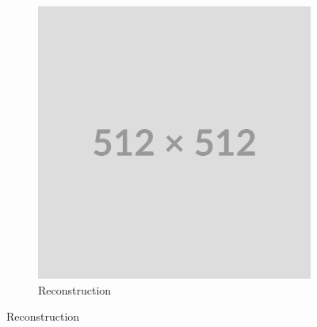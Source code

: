 \begin{figure}
\begin{subfigure}[b]{0.4\textwidth}
        \includegraphics[width=\textwidth]{img/placeholder512.png}
        \caption{Reconstruction}
    \end{subfigure}
    

\end{figure}

